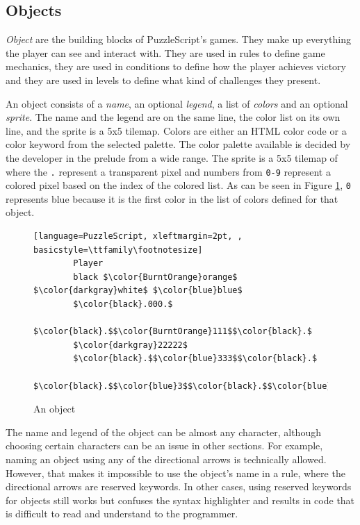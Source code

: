\subsection{Objects}
\emph{Object} are the building blocks of PuzzleScript's games. They make up everything the player can see and interact with. They are used in rules to define game mechanics, they are used in conditions to define how the player achieves victory and they are used in levels to define what kind of challenges they present.

An object consists of a \emph{name}, an optional \emph{legend}, a list of \emph{colors} and an optional \emph{sprite}. The name and the legend are on the same line, the color list on its own line, and the sprite is a 5x5 tilemap. Colors are either an HTML color code or a color keyword from the selected palette. The color palette available is decided by the developer in the prelude from a wide range. The sprite is a 5x5 tilemap of where the \texttt{.} represent a transparent pixel and numbers from \texttt{0-9} represent a colored pixel based on the index of the colored list. As can be seen in Figure \ref{fig:object_code}, \texttt{0} represents blue because it is the first color in the list of colors defined for that object.

\begin{figure}
    \centering
    \begin{lstlisting}[language=PuzzleScript, xleftmargin=2pt, , basicstyle=\ttfamily\footnotesize]
        Player
        black $\color{BurntOrange}orange$ $\color{darkgray}white$ $\color{blue}blue$
        $\color{black}.000.$
        $\color{black}.$$\color{BurntOrange}111$$\color{black}.$
        $\color{darkgray}22222$
        $\color{black}.$$\color{blue}333$$\color{black}.$
        $\color{black}.$$\color{blue}3$$\color{black}.$$\color{blue}3$$\color{black}.$
    \end{lstlisting}
    \caption{An object}
    \label{fig:object_code}
\end{figure}

The name and legend of the object can be almost any character, although choosing certain characters can be an issue in other sections. For example, naming an object using any of the directional arrows is technically allowed. However, that makes it impossible to use the object's name in a rule, where the directional arrows are reserved keywords. In other cases, using reserved keywords for objects still works but confuses the syntax highlighter and results in code that is difficult to read and understand to the programmer.

